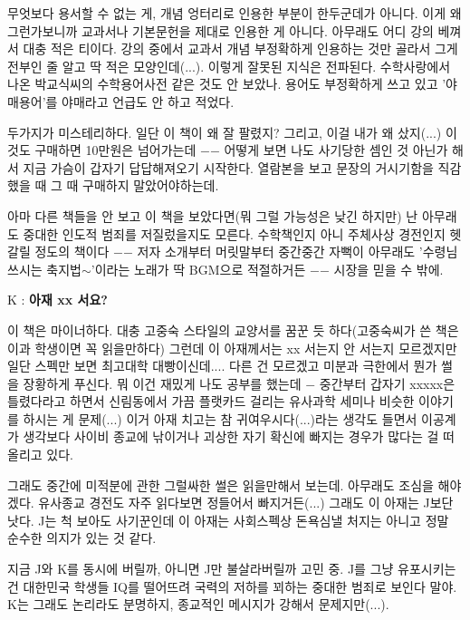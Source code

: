 무엇보다 용서할 수 없는 게, 개념 엉터리로 인용한 부분이 한두군데가 아니다.
이게 왜 그런가보니까 교과서나 기본문헌을 제대로 인용한 게 아니다. 아무래도 어디 강의 베껴서 대충 적은 티이다.
강의 중에서 교과서 개념 부정확하게 인용하는 것만 골라서 그게 전부인 줄 알고 딱 적은 모양인데(...). 이렇게 잘못된 지식은 전파된다.
수학사랑에서 나온 박교식씨의 수학용어사전 같은 것도 안 보았나. 용어도 부정확하게 쓰고 있고 '야매용어'를 야매라고 언급도 안 하고 적었다.
\vspace{5mm}

두가지가 미스테리하다. 일단 이 책이 왜 잘 팔렸지? 그리고, 이걸 내가 왜 샀지(...) 이것도 구매하면 10만원은 넘어가는데 $-$$-$
어떻게 보면 나도 사기당한 셈인 것 아닌가 해서 지금 가슴이 갑자기 답답해져오기 시작한다.
열람본을 보고 문장의 거시기함을 직감했을 때 그 때 구매하지 말았어야하는데.
\vspace{5mm}

아마 다른 책들을 안 보고 이 책을 보았다면(뭐 그럴 가능성은 낮긴 하지만) 난 아무래도 중대한 인도적 범죄를 저질렀을지도 모른다.
수학책인지 아니 주체사상 경전인지 헷갈릴 정도의 책이다 $-$$-$
저자 소개부터 머릿말부터 중간중간 자뻑이 아무래도 '수령님 쓰시는 축지법$\sim$'이라는 노래가 딱 BGM으로 적절하거든 $-$$-$
시장을 믿을 수 밖에.
\vspace{5mm}

K : \textbf{아재 xx 서요?}
\vspace{5mm}

이 책은 마이너하다. 대충 고중숙 스타일의 교양서를 꿈꾼 듯 하다(고중숙씨가 쓴 책은 이과 학생이면 꼭 읽을만하다)
그런데 이 아재께서는 xx 서는지 안 서는지 모르겠지만 일단 스펙만 보면 최고대학 대빵이신데....
다른 건 모르겠고 미분과 극한에서 뭔가 썰을 장황하게 푸신다. 뭐 이건 재밌게 나도 공부를 했는데 $-$
중간부터 갑자기 xxxxx은 틀렸다라고 하면서 신림동에서 가끔 플랫카드 걸리는 유사과학 세미나 비슷한 이야기를 하시는 게 문제(...)
이거 아재 치고는 참 귀여우시다(...)라는 생각도 들면서
이공계가 생각보다 사이비 종교에 낚이거나 괴상한 자기 확신에 빠지는 경우가 많다는 걸 떠올리고 있다.
\vspace{5mm}

그래도 중간에 미적분에 관한 그럴싸한 썰은 읽을만해서 보는데. 아무래도 조심을 해야겠다.
유사종교 경전도 자주 읽다보면 정들어서 빠지거든(...)
그래도 이 아재는 J보단 낫다. J는 척 보아도 사기꾼인데 이 아재는 사회스펙상 돈욕심낼 처지는 아니고 정말 순수한 의지가 있는 것 같다.
\vspace{5mm}

지금 J와 K를 동시에 버릴까, 아니면 J만 불살라버릴까 고민 중.
J를 그냥 유포시키는 건 대한민국 학생들 IQ를 떨어뜨려 국력의 저하를 꾀하는 중대한 범죄로 보인다 말야.
K는 그래도 논리라도 분명하지, 종교적인 메시지가 강해서 문제지만(...).
\vspace{5mm}

